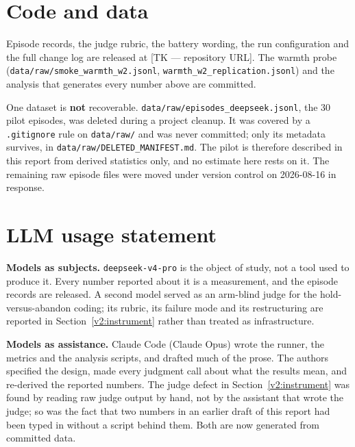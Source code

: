 \documentclass[11pt,a4paper]{article}
\begin{document}
\section*{Code and data}

Episode records, the judge rubric, the battery wording, the run configuration and the full
change log are released at [TK --- repository URL]. The warmth probe
(\texttt{data/raw/smoke\_warmth\_w2.jsonl}, \texttt{warmth\_w2\_replication.jsonl}) and the
analysis that generates every number above are committed.

One dataset is \textbf{not} recoverable. \texttt{data/raw/episodes\_deepseek.jsonl}, the 30
pilot episodes, was deleted during a project cleanup. It was covered by a
\texttt{.gitignore} rule on \texttt{data/raw/} and was never committed; only its metadata
survives, in \texttt{data/raw/DELETED\_MANIFEST.md}. The pilot is therefore described in
this report from derived statistics only, and no estimate here rests on it. The remaining
raw episode files were moved under version control on 2026-08-16 in response.

\section*{LLM usage statement}

\textbf{Models as subjects.} \texttt{deepseek-v4-pro} is the object of study, not a tool
used to produce it. Every number reported about it is a measurement, and the episode
records are released. A second model served as an arm-blind judge for the hold-versus-abandon
coding; its rubric, its failure mode and its restructuring are reported in
Section~\ref{v2:instrument} rather than treated as infrastructure.

\textbf{Models as assistance.} Claude Code (Claude Opus) wrote the runner, the metrics and
the analysis scripts, and drafted much of the prose. The authors specified the design, made
every judgment call about what the results mean, and re-derived the reported numbers. The
judge defect in Section~\ref{v2:instrument} was found by reading raw judge output by hand,
not by the assistant that wrote the judge; so was the fact that two numbers in an earlier
draft of this report had been typed in without a script behind them. Both are now generated
from committed data.
\end{document}
